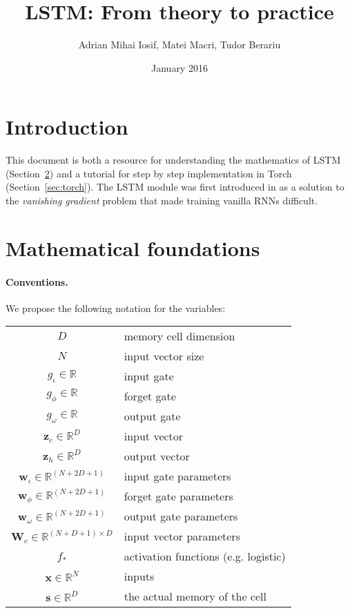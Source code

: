 \documentclass[11pt]{article}
\title{LSTM: From theory to practice}
\author{Adrian Mihai Iosif, Matei Macri, Tudor Berariu}
\date{January 2016}
\begin{document}
\maketitle

\section{Introduction}

This document is both a resource for understanding the mathematics of LSTM (Section~\ref{sec:math}) and a tutorial for step by step implementation in Torch (Section~\ref{sec:torch}).
The LSTM module was first introduced in \cite{hochreiter1997long} as a solution to the \emph{vanishing gradient} problem that made training vanilla RNNs difficult.

\section{Mathematical foundations}
\label{sec:math}

\paragraph{Conventions.} We propose the following notation for the variables:
\begin{center}
\begin{tabular}{c | l}
    $D$ & memory cell dimension \\
    $N$ & input vector size \\
    \hline
    $g_{\iota}\in \mathbb{R}$  & input gate \\
    $g_{\phi}\in \mathbb{R}$  & forget gate \\
    $g_{\omega}\in \mathbb{R}$  & output gate \\
    \hline
    $\mathbf{z}_{c} \in \mathbb{R}^{D}$ & input vector \\
    $\mathbf{z}_h \in \mathbb{R}^{D}$ & output vector \\
    \hline
    $\mathbf{w}_{\iota} \in \mathbb{R}^{(N + 2D + 1)}$ & input gate parameters \\
    $\mathbf{w}_{\phi} \in \mathbb{R}^{(N + 2D + 1)}$ & forget gate parameters \\
    $\mathbf{w}_{\omega} \in \mathbb{R}^{(N + 2D + 1)}$ & output gate parameters \\
    $\mathbf{W}_{c} \in \mathbb{R}^{(N + D + 1)\times D}$ & input vector parameters \\
    \hline
    $f_{*}$ & activation functions (e.g. logistic) \\
    \hline
    $\mathbf{x} \in \mathbb{R}^{N}$ & inputs \\
    $\mathbf{s} \in \mathbb{R}^{D}$ & the actual memory of the cell
\end{tabular}
\end{center}
\end{document}
